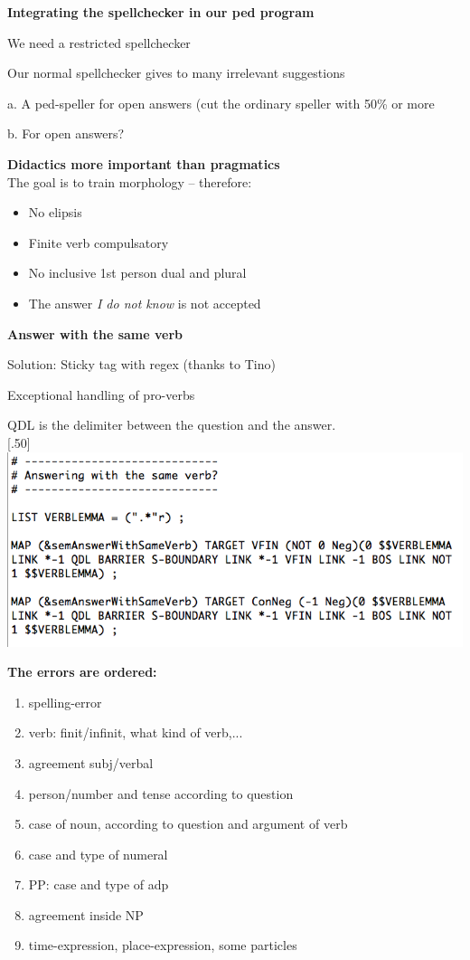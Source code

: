 \documentclass[landscape,norsk,11pt]{seminar}
\begin{document}
\begin{slide}
\newslide
\textbf{Integrating the spellchecker in our ped program}

We need a restricted spellchecker

Our normal spellchecker gives to many irrelevant suggestions

a. A ped-speller for open answers (cut the ordinary speller with 50\% or more

b. For open answers?



\newslide
\textbf{Didactics more important than pragmatics} \\
The goal is to train morphology -- therefore:
\begin{itemize}
\item{No elipsis							  }
\item{Finite verb compulsatory}
\item{No inclusive 1st person dual and plural}
\item{The answer \textit{I do not know} is not accepted}
\end{itemize}


\newslide
\textbf{Answer with the same verb}

Solution: Sticky tag with regex (thanks to Tino)

Exceptional handling of pro-verbs 

\newslide
QDL is the delimiter between the question and the answer. \\
\newline
\scalebox{.50}[.50]{\includegraphics{img/answering_same_verb.png}}


\newslide

\textbf{The errors are ordered:}
\begin{enumerate}
\item spelling-error
\item verb: finit/infinit, what kind of verb,...
\item agreement subj/verbal
\item person/number and tense according to question
\item case of noun, according to question and argument of verb 
\item case and type of numeral
\item PP: case and type of adp
\item agreement inside NP
\item time-expression, place-expression, some particles
\end{enumerate}



\end{slide}
\end{document}
